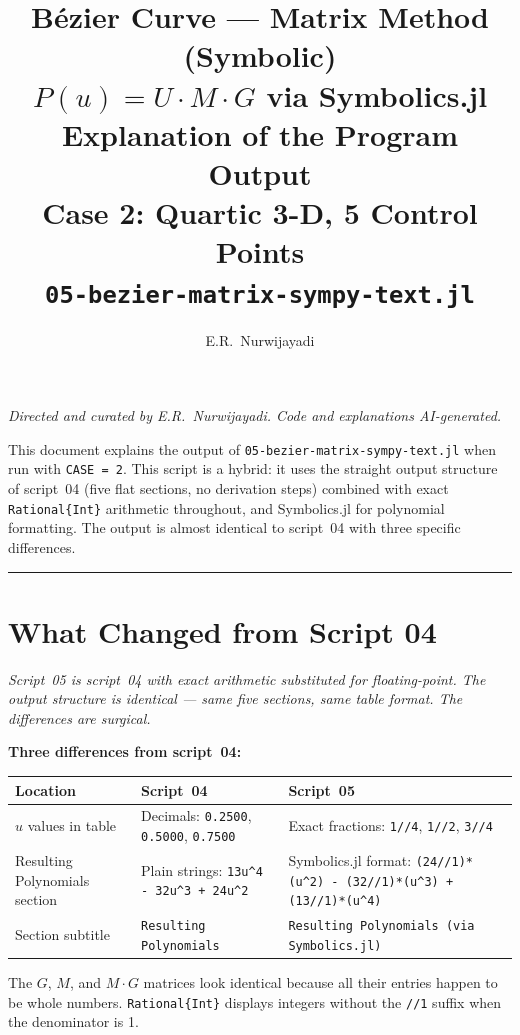 \documentclass[12pt, a4paper]{article}
\title{%
  \vspace{1cm}
  {\LARGE\bfseries B\'ezier Curve --- Matrix Method (Symbolic)}\\[0.4em]
  {\large $P(u) = U \cdot M \cdot G$ \quad via Symbolics.jl}\\[0.4em]
  {\large Explanation of the Program Output}\\[0.4em]
  {\normalsize Case 2: Quartic 3-D, 5 Control Points}\\[0.4em]
  {\normalsize\texttt{05-bezier-matrix-sympy-text.jl}}
}
\author{E.R.\ Nurwijayadi}
\date{\DTMtoday}
\newcommand{\cd}[1]{\texttt{#1}}
\begin{document}

\maketitle
\thispagestyle{empty}

\begin{center}
\textit{Directed and curated by E.R.\ Nurwijayadi.
Code and explanations AI-generated.}
\end{center}

\begin{center}
\begin{minipage}{0.85\textwidth}
\small
This document explains the output of
\cd{05-bezier-matrix-sympy-text.jl} when run with \cd{CASE = 2}.
This script is a hybrid: it uses the straight output structure
of script~04 (five flat sections, no derivation steps)
combined with exact \cd{Rational\{Int\}} arithmetic throughout,
and Symbolics.jl for polynomial formatting.
The output is almost identical to script~04 with three
specific differences.
\end{minipage}
\end{center}

\vspace{1em}\hrule\vspace{1.5em}
\tableofcontents
\newpage


\section{What Changed from Script 04}

\textit{Script~05 is script~04 with exact arithmetic substituted
for floating-point.
The output structure is identical --- same five sections,
same table format.
The differences are surgical.}

\begin{diffbox}
\textbf{Three differences from script~04:}

\medskip
\begin{tabular}{lp{4.5cm}p{4.5cm}}
\toprule
Location & Script~04 & Script~05 \\
\midrule
$u$ values in table &
  Decimals: \cd{0.2500}, \cd{0.5000}, \cd{0.7500} &
  Exact fractions: \cd{1//4}, \cd{1//2}, \cd{3//4} \\[6pt]
Resulting Polynomials section &
  Plain strings: \cd{13u\^{}4 - 32u\^{}3 + 24u\^{}2} &
  Symbolics.jl format: \cd{(24//1)*(u\^{}2) - (32//1)*(u\^{}3) + (13//1)*(u\^{}4)} \\[6pt]
Section subtitle &
  \cd{Resulting Polynomials} &
  \cd{Resulting Polynomials (via Symbolics.jl)} \\
\bottomrule
\end{tabular}

\medskip
The $G$, $M$, and $M \cdot G$ matrices look identical
because all their entries happen to be whole numbers.
\cd{Rational\{Int\}} displays integers without the \cd{//1}
suffix when the denominator is 1.
\end{diffbox}
\end{document}
